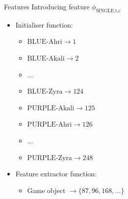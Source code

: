 \begin{frame}{Features}
Introducing feature $\phi_\text{SINGLE,t,c}$
\begin{itemize}
\item Initialiser function:
	\begin{itemize}
	\item $\text{BLUE-Ahri} \rightarrow 1$
	\item $\text{BLUE-Akali} \rightarrow 2$
	\item ...
	\item $\text{BLUE-Zyra} \rightarrow 124$
	\item $\text{PURPLE-Akali} \rightarrow 125$
	\item $\text{PURPLE-Ahri} \rightarrow 126$
	\item ...
	\item $\text{PURPLE-Zyra}\rightarrow 248$
	\end{itemize}
\item Feature extractor function:  
	\begin{itemize}
	\item Game object $\rightarrow \{87, 96, 168, ...\}$
	\end{itemize}
\end{itemize}
\end{frame}